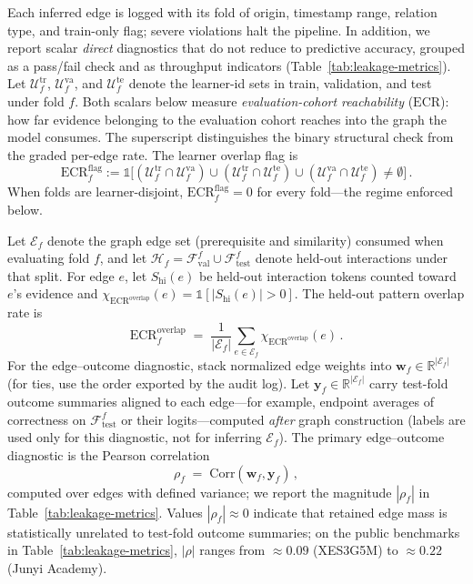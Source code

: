 \documentclass[preprint,10pt,doubleblind]{elsarticle}
\begin{document}
Each inferred edge is logged with its fold of origin, timestamp range,
relation type, and train-only flag; severe violations halt the pipeline.
In addition, we report scalar \emph{direct} diagnostics that do
not reduce to predictive accuracy, grouped as a pass/fail check and as
throughput indicators (Table~\ref{tab:leakage-metrics}). Let $\mathcal{U}^{\mathrm{tr}}_f$,
$\mathcal{U}^{\mathrm{va}}_f$, and $\mathcal{U}^{\mathrm{te}}_f$ denote the
learner-id sets in train, validation, and test under fold $f$. Both scalars
below measure \emph{evaluation-cohort reachability} ($\mathrm{ECR}$): how far
evidence belonging to the evaluation cohort reaches into the graph the model
consumes. The superscript distinguishes the binary structural check from the
graded per-edge rate. The learner overlap flag is
\begin{equation}
\mathrm{ECR}^{\mathrm{flag}}_f := \mathbb{1}\big[
(\mathcal{U}^{\mathrm{tr}}_f \cap \mathcal{U}^{\mathrm{va}}_f) \cup
(\mathcal{U}^{\mathrm{tr}}_f \cap \mathcal{U}^{\mathrm{te}}_f) \cup
(\mathcal{U}^{\mathrm{va}}_f \cap \mathcal{U}^{\mathrm{te}}_f)
\neq \emptyset
\big]\,.
\label{eq:ecr-flag}
\end{equation}
When folds are learner-disjoint, $\mathrm{ECR}^{\mathrm{flag}}_f=0$ for every fold---the regime enforced below.

Let $\mathcal{E}_f$ denote the graph edge set (prerequisite and similarity) consumed when evaluating fold
$f$, and let $\mathcal{H}_f = \mathcal{F}_{\text{val}}^{f} \cup
\mathcal{F}_{\text{test}}^{f}$ denote held-out interactions under that
split. For edge $e$, let $S_{\text{hi}}(e)$ be held-out interaction tokens counted
toward $e$'s evidence and
$\chi_{\mathrm{ECR}^{\mathrm{overlap}}}(e)=\mathbb{1}[|S_{\text{hi}}(e)|>0]$.
The held-out pattern overlap rate is
\begin{equation}
\mathrm{ECR}^{\mathrm{overlap}}_f \;=\; \frac{1}{|\mathcal{E}_f|}\sum_{e\in\mathcal{E}_f}
\chi_{\mathrm{ECR}^{\mathrm{overlap}}}(e)\,.
\label{eq:ecr-overlap}
\end{equation}
For the edge--outcome diagnostic, stack normalized edge weights into
$\mathbf{w}_f\in\mathbb{R}^{|\mathcal{E}_f|}$ (for ties, use the order
exported by the audit log). Let $\mathbf{y}_f\in\mathbb{R}^{|\mathcal{E}_f|}$
carry test-fold outcome summaries aligned to each edge---for example,
endpoint averages of correctness on $\mathcal{F}_{\text{test}}^{f}$ or
their logits---computed \emph{after} graph construction (labels are used
only for this diagnostic, not for inferring $\mathcal{E}_f$).
The primary edge--outcome diagnostic is the Pearson correlation
\begin{equation}
\rho_f \;=\; \mathrm{Corr}(\mathbf{w}_f,\mathbf{y}_f)\,,
\label{eq:rho-edge-outcome}
\end{equation}
computed over edges with defined variance; we report the magnitude
$|\rho_f|$ in Table~\ref{tab:leakage-metrics}. Values
$|\rho_f|\!\approx\!0$ indicate that retained edge mass is statistically
unrelated to test-fold outcome summaries; on the public benchmarks in
Table~\ref{tab:leakage-metrics}, $|\rho|$ ranges from ${\approx}0.09$
(XES3G5M) to ${\approx}0.22$ (Junyi Academy).
\end{document}
